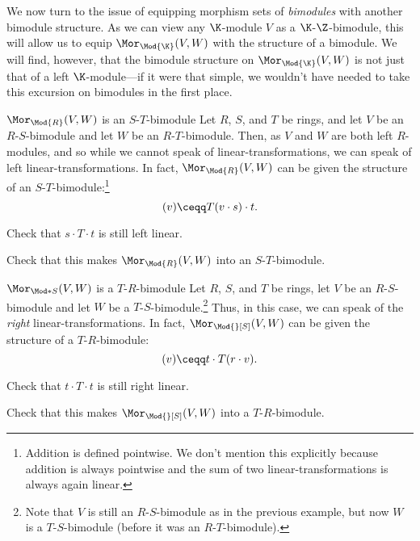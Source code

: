 We now turn to the issue of equipping morphism sets of \emph{bimodules} with another bimodule structure.  As we can view any $\K$-module $V$ as a $\K$-$\Z$-bimodule, this will allow us to equip $\Mor _{\Mod{\K}}(V,W)$ with the structure of a bimodule.  We will find, however, that the bimodule structure on $\Mor _{\Mod{\K}}(V,W)$ is not just that of a left $\K$-module---if it were that simple, we wouldn't have needed to take this excursion on bimodules in the first place.
\begin{exm}{$\Mor _{\Mod{R}}(V,W)$ is an $S$-$T$-bimodule}{}
	Let $R$, $S$, and $T$ be rings, and let $V$ be an $R$-$S$-bimodule and let $W$ be an $R$-$T$-bimodule.  Then, as $V$ and $W$ are both left $R$-modules, and so while we cannot speak of linear-transformations, we can speak of left linear-transformations.  In fact, $\Mor _{\Mod{R}}(V,W)$ can be given the structure of an $S$-$T$-bimodule:\footnote{Addition is defined pointwise.  We don't mention this explicitly because addition is always pointwise and the sum of two linear-transformations is always again linear.}
	\begin{equation}
		[s\cdot T\cdot t](v)\ceqq T(v\cdot s)\cdot t.
	\end{equation}
	\begin{exr}[breakable=false]{}{}
		Check that $s\cdot T\cdot t$ is still left linear.
	\end{exr}
	\begin{exr}[breakable=false]{}{}
		Check that this makes $\Mor _{\Mod{R}}(V,W)$ into an $S$-$T$-bimodule.
	\end{exr}
\end{exm}
\begin{exm}{$\Mor _{\Mod*{S}}(V,W)$ is a $T$-$R$-bimodule}{}
	Let $R$, $S$, and $T$ be rings, let $V$ be an $R$-$S$-bimodule and let $W$ be a $T$-$S$-bimodule.\footnote{Note that $V$ is still an $R$-$S$-bimodule as in the previous example, but now $W$ is a $T$-$S$-bimodule (before it was an $R$-$T$-bimodule).}  Thus, in this case, we can speak of the \emph{right} linear-transformations.  In fact, $\Mor _{\Mod{}[S]}(V,W)$ can be given the structure of a $T$-$R$-bimodule:
	\begin{equation}
		[t\cdot T\cdot r](v)\ceqq t\cdot T(r\cdot v).
	\end{equation}
	\begin{exr}[breakable=false]{}{}
		Check that $t\cdot T\cdot t$ is still right linear.
	\end{exr}
	\begin{exr}[breakable=false]{}{}
		Check that this makes $\Mor _{\Mod{}[S]}(V,W)$ into a $T$-$R$-bimodule.
	\end{exr}
\end{exm}
